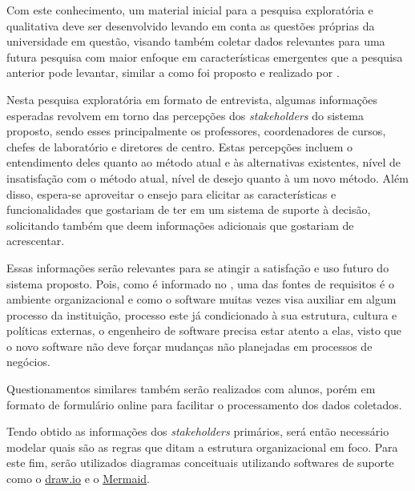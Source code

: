 
    Com este conhecimento, um material inicial para a pesquisa exploratória e qualitativa deve ser desenvolvido levando em conta as questões próprias da universidade em questão, visando também coletar dados relevantes para uma futura pesquisa com maior enfoque em características emergentes que a pesquisa anterior pode levantar, similar a como foi proposto e realizado por \cite{andre_interaction_2018}.

    Nesta pesquisa exploratória em formato de entrevista, algumas informações esperadas revolvem em torno das percepções dos \textit{stakeholders} do sistema proposto, sendo esses principalmente os professores, coordenadores de cursos, chefes de laboratório e diretores de centro. Estas percepções incluem o entendimento deles quanto ao método atual e às alternativas existentes, nível de insatisfação com o método atual, nível de desejo quanto à um novo método. Além disso, espera-se aproveitar o ensejo para elicitar as características e funcionalidades que gostariam de ter em um sistema de suporte à decisão, solicitando também que deem informações adicionais que gostariam de acrescentar.

    Essas informações serão relevantes para se atingir a satisfação e uso futuro do sistema proposto. Pois, como é informado no \cite{bourque_swebok_2014}, uma das fontes de requisitos é o ambiente organizacional e como o software muitas vezes visa auxiliar em algum processo da instituição, processo este já condicionado à sua estrutura, cultura e políticas externas, o engenheiro de software precisa estar atento a elas, visto que o novo software não deve forçar mudanças não planejadas em processos de negócios.

    Questionamentos similares também serão realizados com alunos, porém em formato de formulário online para facilitar o processamento dos dados coletados.

    \def\LinkParadigm{https://www.visual-paradigm.com/}
    \def\LinkDrawio{https://www.drawio.com/}
    \def\LinkMermaid{https://mermaid.js.org/}


    Tendo obtido as informações dos \textit{stakeholders} primários, será então necessário modelar quais são as regras que ditam a estrutura organizacional em foco. Para este fim, serão utilizados diagramas conceituais utilizando softwares de suporte como o \href{https://draw.io/}{draw.io} e o \href{https://mermaid.js.org/}{Mermaid}.

